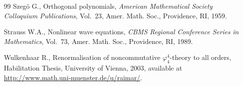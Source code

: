 \documentclass[11pt]{article}
\begin{document}
\begin{thebibliography}{99}
Szeg\"o G.,
Orthogonal polynomials,  {\it American Mathematical Society Colloquium Publications}, Vol.~23, Amer. Math. Soc., Providence, RI, 1959.

Strauss W.A.,
Nonlinear wave equations,
{\it CBMS Regional Conference Series in Mathematics}, Vol.~73, Amer. Math. Soc., Providence, RI, 1989.

 Wulkenhaar R., Renormalisation of noncommutative $\varphi_4^4$-theory to all orders, Habilitation Thesis, University of Vienna, 2003, available at \url{http://www.math.uni-muenster.de/u/raimar/}.

\end{thebibliography}
\end{document}
